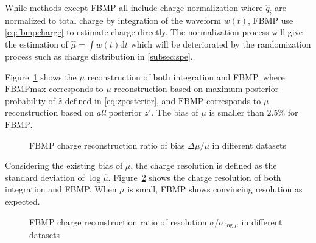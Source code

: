 While methods except FBMP all include charge normalization where $\hat{q}_i$ are normalized to total charge by integration of the waveform $w(t)$, FBMP use \eqref{eq:fbmpcharge} to estimate charge directly. The normalization process will give the estimation of $\hat{\mu}=\int w(t)\mathrm{d}t$ which will be deteriorated by the randomization process such as charge distribution in \ref{subsec:spe}. 

Figure~\ref{fig:biasmu} shows the $\mu$ reconstruction of both integration and FBMP, where $\mathrm{FBMPmax}$ corresponds to $\mu$ reconstruction based on maximum posterior probability of $\hat{z}$ defined in \eqref{eq:zposterior}, and $\mathrm{FBMP}$ corresponds to $\mu$ reconstruction based on \textit{all} posterior $z'$. The bias of $\mu$ is smaller than $2.5\%$ for $\mathrm{FBMP}$. 

\begin{figure}[H]
    \centering
    \resizebox{\textwidth}{!}{}
    \caption{\label{fig:biasmu} FBMP charge reconstruction ratio of bias $\Delta\mu/\mu$ in different datasets}
\end{figure}

Considering the existing bias of $\mu$, the charge resolution is defined as the standard deviation of $\log{\hat{\mu}}$. Figure~\ref{fig:deltamu} shows the charge resolution of both integration and FBMP. When $\mu$ is small, FBMP shows convincing resolution as expected. 

\begin{figure}[H]
    \centering
    \resizebox{\textwidth}{!}{}
    \caption{\label{fig:deltamu} FBMP charge reconstruction ratio of resolution $\sigma/\sigma_{\log\mu}$ in different datasets}
\end{figure}

